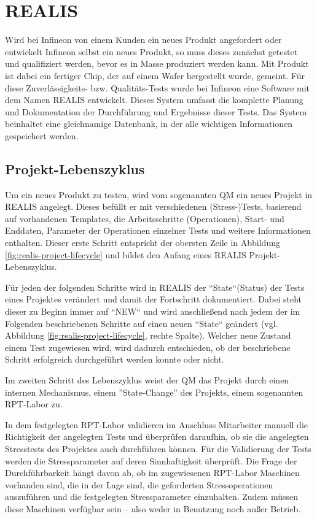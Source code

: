 \section{REALIS}\label{Sec:REALIS}
Wird bei Infineon von einem Kunden ein neues Produkt angefordert oder entwickelt Infineon selbst ein neues Produkt, so muss dieses zunächst getestet und qualifiziert werden, bevor es in Masse produziert werden kann. Mit Produkt ist dabei ein fertiger Chip, der auf einem Wafer hergestellt wurde, gemeint. Für diese Zuverlässigkeits- bzw. Qualitäts-Tests wurde bei Infineon eine Software mit dem Namen \gls{REALIS} entwickelt. Dieses System umfasst die komplette Planung und Dokumentation der Durchführung und Ergebnisse dieser Tests. Das System beinhaltet eine gleichnamige Datenbank, in der alle wichtigen Informationen gespeichert werden.

\subsection{Projekt-Lebenszyklus}\label{Subsec:project-lifecycle}
Um ein neues Produkt zu testen, wird vom sogenannten \gls{QM} ein neues Projekt in \gls{REALIS} angelegt. Dieses befüllt er mit verschiedenen (Stress-)Tests, basierend auf vorhandenen Templates, die Arbeitsschritte (Operationen), Start- und Enddaten, Parameter der Operationen einzelner Tests und weitere Informationen enthalten. Dieser erste Schritt entspricht der obersten Zeile in Abbildung \ref{fig:realis-project-lifecycle} und bildet den Anfang eines REALIS Projekt-Lebenszyklus. 

Für jeden der folgenden Schritte wird in \gls{REALIS} der ``State``(Status) der Tests eines Projektes verändert und damit der Fortschritt dokumentiert. Dabei steht dieser zu Beginn immer auf  ``NEW`` und wird anschließend nach jedem der im Folgenden beschriebenen Schritte auf einen neuen ``State`` geändert (vgl. Abbildung \ref{fig:realis-project-lifecycle}, rechte Spalte). Welcher neue Zustand einem Test zugewiesen wird, wird dadurch entschieden, ob der beschriebene Schritt erfolgreich durchgeführt werden konnte oder nicht.

Im zweiten Schritt des Lebenszyklus weist der \gls{QM} das Projekt durch einen internen Mechanismus, einem ''State-Change'' des Projekts, einem sogenannten \gls{RPT}-Labor zu. 

In dem festgelegten \gls{RPT}-Labor validieren im Anschluss Mitarbeiter manuell die Richtigkeit der angelegten Tests und überprüfen daraufhin, ob sie die angelegten Stresstests des Projektes auch durchführen können. 
Für die Validierung der Tests werden die Stressparameter auf deren Sinnhaftigkeit überprüft. Die Frage der Durchführbarkeit hängt davon ab, ob im zugewiesenen \gls{RPT}-Labor Maschinen vorhanden sind, die in der Lage sind, die geforderten Stressoperationen auszuführen und die festgelegten Stressparameter einzuhalten. Zudem müssen diese Maschinen verfügbar sein – also weder in Benutzung noch außer Betrieb.


